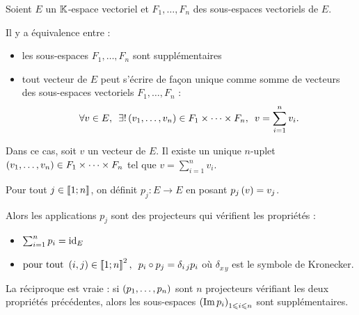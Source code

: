 \begin{prop}
Soient \(E\) un \(\mathbb{K}\)-espace vectoriel et \(F_1,\dots,F_n\) des sous-espaces vectoriels de \(E\).

Il y a équivalence entre :

\begin{itemize}
    \item les sous-espaces \(F_1,\dots,F_n\) sont supplémentaires \\
    \item tout vecteur de \(E\) peut s'écrire de façon unique comme somme de vecteurs des sous-espaces vectoriels \(F_1,\dots,F_n\) : \[\quantifs{\forall v\in E;\exists!\paren{v_1,\dots,v_n}\in F_1\times\dots\times F_n}v=\sum_{i=1}^nv_i.\]
\end{itemize}
\end{prop}

Dans ce cas, soit \(v\) un vecteur de \(E\). Il existe un unique \(n\)-uplet \(\left(v_1,\dots,v_n\right)\in F_1\times\dots\times F_n\) tel que \(v=\sum_{i=1}^nv_i\).

Pour tout \(j\in\left\llbracket1;n\right\rrbracket\), on définit \(p_j:E\to E\) en posant \(p_j\left(v\right)=v_j\).

Alors les applications \(p_j\) sont des projecteurs qui vérifient les propriétés :

\begin{itemize}
    \item \(\sum_{i=1}^np_i=\mathrm{id}_{E}\) \\
    \item \(\quantifs{\tpt\paren{i,j}\in\interventierii{1}{n}^2}p_i\rond p_j=\delta_{i\,j}p_i\) où \(\delta_{x\,y}\) est le symbole de Kronecker.
\end{itemize}

La réciproque est vraie : si \(\left(p_1,\dots,p_n\right)\) sont \(n\) projecteurs vérifiant les deux propriétés précédentes, alors les sous-espaces \(\left(\operatorname{Im} p_i\right)_{1\leqslant i\leqslant n}\) sont supplémentaires.


